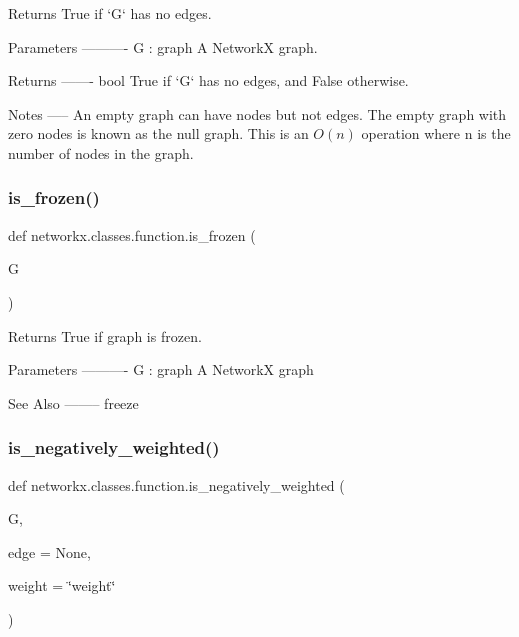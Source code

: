 \begin{DoxyVerb}Returns True if `G` has no edges.

Parameters
----------
G : graph
    A NetworkX graph.

Returns
-------
bool
    True if `G` has no edges, and False otherwise.

Notes
-----
An empty graph can have nodes but not edges. The empty graph with zero
nodes is known as the null graph. This is an $O(n)$ operation where n
is the number of nodes in the graph.\end{DoxyVerb}
 \mbox{\label{namespacenetworkx_1_1classes_1_1function_a5c8a779487dbd0a50e0e327728477d8b}} 
\subsubsection{\texorpdfstring{is\+\_\+frozen()}{is\_frozen()}}
{\footnotesize\ttfamily def networkx.\+classes.\+function.\+is\+\_\+frozen (\begin{DoxyParamCaption}\item[{}]{G }\end{DoxyParamCaption})}

\begin{DoxyVerb}Returns True if graph is frozen.

Parameters
----------
G : graph
  A NetworkX graph

See Also
--------
freeze
\end{DoxyVerb}
 \mbox{\label{namespacenetworkx_1_1classes_1_1function_a9ac6a2e602a81557057e8ba62fb17769}} 
\subsubsection{\texorpdfstring{is\+\_\+negatively\+\_\+weighted()}{is\_negatively\_weighted()}}
{\footnotesize\ttfamily def networkx.\+classes.\+function.\+is\+\_\+negatively\+\_\+weighted (\begin{DoxyParamCaption}\item[{}]{G,  }\item[{}]{edge = {\ttfamily None},  }\item[{}]{weight = {\ttfamily \char`\"{}weight\char`\"{}} }\end{DoxyParamCaption})}

